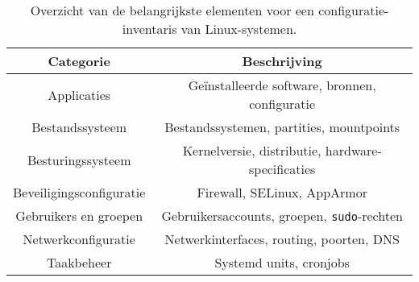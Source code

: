 \begin{table}[!h]
    \begin{center}
        \begin{tabular}{ c c }
            \hline
                Categorie & Beschrijving \\ [0.5ex] 
            \hline
                Applicaties              & Ge\"installeerde software, bronnen, configuratie \\
                Bestandssysteem          & Bestandssystemen, partities, mountpoints \\
                Besturingssysteem        & Kernelversie, distributie, hardware-specificaties \\
                Beveiligingsconfiguratie & Firewall, SELinux, AppArmor \\
                Gebruikers en groepen    & Gebruikersaccounts, groepen, \texttt{sudo}-rechten \\
                Netwerkconfiguratie      & Netwerkinterfaces, routing, poorten, DNS \\
                Taakbeheer               & Systemd units, cronjobs \\
        \end{tabular}
    \end{center}
    \caption{Overzicht van de belangrijkste elementen voor een configuratie-inventaris van Linux-systemen.}
    \label{table:risico_conclusie}
\end{table}
